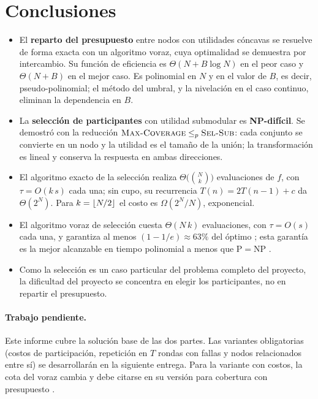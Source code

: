 \section{Conclusiones}

\begin{itemize}
  \item El \textbf{reparto del presupuesto} entre nodos con utilidades cóncavas se resuelve de forma exacta con un algoritmo voraz, cuya optimalidad se demuestra por intercambio. Su función de eficiencia es $\Theta(N+B\log N)$ en el peor caso y $\Theta(N+B)$ en el mejor caso. Es polinomial en $N$ y en el valor de $B$, es decir, pseudo-polinomial; el método del umbral, y la nivelación en el caso continuo, eliminan la dependencia en $B$.
  \item La \textbf{selección de participantes} con utilidad submodular es \textbf{NP-difícil}. Se demostró con la reducción $\textsc{Max-Coverage}\le_p\textsc{Sel-Sub}$: cada conjunto se convierte en un nodo y la utilidad es el tamaño de la unión; la transformación es lineal y conserva la respuesta en ambas direcciones.
  \item El algoritmo exacto de la selección realiza $\Theta\big(\binom{N}{k}\big)$ evaluaciones de $f$, con $\tau=O(k\,s)$ cada una; sin cupo, su recurrencia $T(n)=2T(n-1)+c$ da $\Theta(2^N)$. Para $k=\lfloor N/2\rfloor$ el costo es $\Omega(2^N/N)$, exponencial.
  \item El algoritmo voraz de selección cuesta $\Theta(N\,k)$ evaluaciones, con $\tau=O(s)$ cada una, y garantiza al menos $(1-1/e)\approx 63\%$ del óptimo \parencite{nemhauser1978}; esta garantía es la mejor alcanzable en tiempo polinomial a menos que $\mathrm{P}=\mathrm{NP}$ \parencite{feige1998}.
  \item Como la selección es un caso particular del problema completo del proyecto, la dificultad del proyecto se concentra en elegir los participantes, no en repartir el presupuesto.
\end{itemize}

\paragraph{Trabajo pendiente.} Este informe cubre la solución base de las dos partes. Las variantes obligatorias (costos de participación, repetición en $T$ rondas con fallas y nodos relacionados entre sí) se desarrollarán en la siguiente entrega. Para la variante con costos, la cota del voraz cambia y debe citarse en su versión para cobertura con presupuesto \parencite{khuller1999}.

